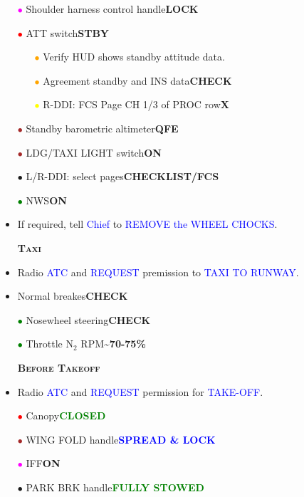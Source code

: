 \documentclass[a4paper,12pt,dvipsnames]{letter}
\newcommand{\radio}[1]{\textcolor{blue}{#1}}
\newcommand{\button}[1]{\textbf{#1}}
\newcommand{\ok}[1]{\textcolor{Green}{\textbf{#1}}}
\newcommand{\boat}[1]{\textcolor{Blue}{\textbf{#1}}}
\newcommand{\myHead}[1]{{\LARGE\textsc{\textbf{#1}}}}
\newcommand{\bi}{\textcolor{ProcessBlue}{$\bullet$\;}}
\newcommand{\ri}{\textcolor{Red}{$\bullet$\;}}
\newcommand{\gi}{\textcolor{Green}{$\bullet$\;}}
\newcommand{\yi}{\textcolor{Yellow}{$\bullet$\;}}
\newcommand{\mi}{\textcolor{Magenta}{$\bullet$\;}}
\newcommand{\oi}{\textcolor{Orange}{$\bullet$\;}}
\renewcommand{\ni}{\textcolor{Brown}{$\bullet$\;}}
\begin{document}
{\begin{itemize}
 \item[\mi] Shoulder harness control handle\dotfill\button{LOCK}
 \item[\ri] ATT switch\dotfill\button{STBY}
 \begin{itemize}
  \item[\oi] Verify HUD shows standby attitude data.
  \item[\oi] Agreement standby and INS data\dotfill\button{CHECK}
  \item[\yi] R-DDI: FCS Page CH 1/3 of PROC row\dotfill\button{X}
 \end{itemize}  
 \item[\ni] Standby barometric altimeter\dotfill\button{QFE}
 \item[\ni] LDG/TAXI LIGHT switch\dotfill\button{ON}
 \item[\bi] L/R-DDI: select pages\dotfill\button{CHECKLIST/FCS}
 \item[\gi] NWS\dotfill\button{ON}
 \item If required, tell \radio{Chief} to \radio{REMOVE the WHEEL CHOCKS}.
\end{itemize}
\newpage
\begin{itemize}
 \item[] \myHead{Taxi}
 \item Radio \radio{ATC} and \radio{REQUEST} premission to \radio{TAXI TO RUNWAY}.
 \item Normal breakes\dotfill\button{CHECK}
 \item[\gi] Nosewheel steering\dotfill\button{CHECK}
 \item[\gi] Throttle N$_2$ RPM\dotfill\button{\textasciitilde70-75\%}
\end{itemize}
\vspace{0.5em}
\begin{itemize}
 \item[] \myHead{Before Takeoff}
 \item Radio \radio{ATC} and \radio{REQUEST} permission for \radio{TAKE-OFF}.
 \item[\ri] Canopy\dotfill\ok{CLOSED}
 \item[\ni] WING FOLD handle\dotfill\boat{SPREAD \& LOCK}
 \item[\mi] IFF\dotfill\button{ON}
 \item[\bi] PARK BRK handle\dotfill\ok{FULLY STOWED}

\end{itemize}}
\end{document}
